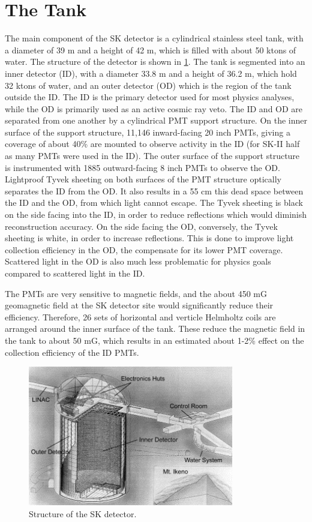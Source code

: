\section{The Tank}
\label{sec:tank}
The main component of the SK detector is a cylindrical stainless steel tank, with a diameter of 39 m and a height of 42 m, which is filled with about 50 ktons of water.  The structure of the detector is shown in \cref{fig:sk_detector_diagrams}.  The tank is segmented into an inner detector (ID), with a diameter 33.8 m and a height of 36.2 m, which hold 32 ktons of water, and an outer detector (OD) which is the region of the tank outside the ID.  The ID is the primary detector used for most physics analyses, while the OD is primarily used as an active cosmic ray veto.  The ID and OD are separated from one another by a cylindrical PMT support structure.  On the inner surface of the support structure, 11,146 inward-facing 20 inch PMTs, giving a coverage of about 40\% are mounted to observe activity in the ID (for SK-II half as many PMTs were used in the ID).  The outer surface of the support structure is instrumented with 1885 outward-facing 8 inch PMTs to observe the OD.  Lightproof Tyvek sheeting on both surfaces of the PMT structure optically separates the ID from the OD.  It also results in a 55 cm this dead space between the ID and the OD, from which light cannot escape.  The Tyvek sheeting is black on the side facing into the ID, in order to reduce reflections which would diminish reconstruction accuracy.  On the side facing the OD, conversely, the Tyvek sheeting is white, in order to increase reflections.  This is done to improve light collection efficiency in the OD, the compensate for its lower PMT coverage.  Scattered light in the OD is also much less problematic for physics goals compared to scattered light in the ID. \par
The PMTs are very sensitive to magnetic fields, and the about 450 mG geomagnetic field at the SK detector site would significantly reduce their efficiency.  Therefore, 26 sets of horizontal and verticle Helmholtz coils are arranged around the inner surface of the tank.  These reduce the magnetic field in the tank to about 50 mG, which results in an estimated about 1-2\% effect on the collection efficiency of the ID PMTs. 

\begin{figure}
\centering
\includegraphics[width=0.8\textwidth]{figures/sk_detector_under_mountain.jpg}
\caption{Structure of the SK detector. \cite{Fukuda:2002uc}}
\label{fig:sk_detector_diagrams} 
\end{figure}


